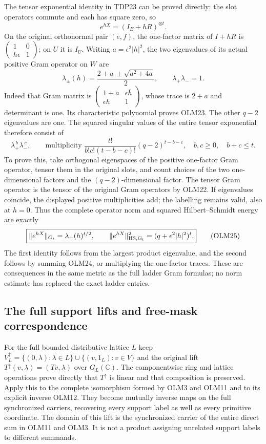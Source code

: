 The tensor exponential identity in TDP23 can be proved directly:
the slot operators commute and each has square zero, so
\[
e^{hX}=(I_E+hR)^{\otimes t}.
\tag{OLM22}
\]
On the original orthonormal pair $(e,f)$, the one-factor matrix
of $I+hR$ is
$\left(\begin{smallmatrix}1&0\\h\epsilon&1\end{smallmatrix}\right)$;
on $U$ it is $I_U$.
Writing $a=\epsilon^2|h|^2$, the two eigenvalues of its actual
positive Gram operator on $W$ are
\[
\lambda_\pm(h)=\frac{2+a\ \pm\sqrt{a^2+4a}}2,
\qquad\lambda_+\lambda_-=1.
\tag{OLM23}
\]
Indeed that Gram matrix is
$\left(\begin{smallmatrix}1+a&\epsilon\overline h\\
\epsilon h&1\end{smallmatrix}\right)$, whose trace is $2+a$
and determinant is one. Its characteristic polynomial proves
OLM23. The other $q-2$ eigenvalues are one.
The squared singular values of the entire tensor exponential
therefore consist of
\[
\lambda_+^{\,b}\lambda_-^{\,c},\qquad
\text{multiplicity }\frac{t!}{b!c!(t-b-c)!}(q-2)^{t-b-c},
\quad b,c\ge0,\quad b+c\le t.
\tag{OLM24}
\]
To prove this, take orthogonal eigenspaces of the positive
one-factor Gram operator, tensor them in the original slots,
and count choices of the two one-dimensional factors and
the $(q-2)$-dimensional factor. The tensor Gram operator is
the tensor of the original Gram operators by OLM22.
If eigenvalues coincide, the displayed positive multiplicities
add; the labelling remains valid, also at $h=0$.
Thus the complete operator norm and squared Hilbert--Schmidt
energy are exactly
\[
\boxed{
\|e^{hX}\|_{G_t}=\lambda_+(h)^{t/2},\qquad
\|e^{hX}\|_{\rm HS,G_t}^2=(q+\epsilon^2|h|^2)^t.}
\tag{OLM25}
\]
The first identity follows from the largest product eigenvalue,
and the second follows by summing OLM24, or multiplying the
one-factor traces. These are consequences in the same metric
as the full ladder Gram formulas; no norm estimate has replaced
the exact ladder entries.

\subsection{The full support lifts and free-mask correspondence}

For the full bounded distributive lattice $L$ keep
$V_L^\uparrow=\{(0,\lambda):\lambda\in L\}
\cup\{(v,1_L):v\in V\}$ and the original lift
$T^\uparrow(v,\lambda)=(Tv,\lambda)$ over $G_L(\mathbb C)$.
The componentwise ring and lattice operations prove directly
that $T^\uparrow$ is linear and that composition is preserved.
Apply this to the complete isomorphism formed by OLM3 and
OLM11 and to its explicit inverse OLM12.
They become mutually inverse maps on the full synchronized
carriers, recovering every support label as well as every
primitive coordinate. The domain of this lift is the
synchronized carrier of the entire direct sum in OLM11 and
OLM3. It is not a product assigning unrelated support labels
to different summands.

